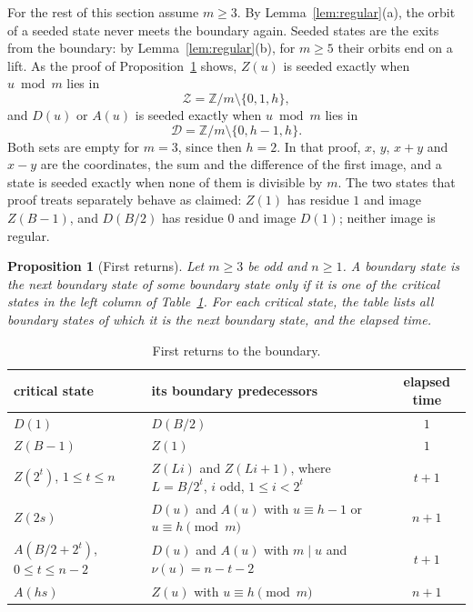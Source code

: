 \documentclass[11pt]{amsart}
\newtheorem{proposition}[theorem]{Proposition}
\theoremstyle{definition}
\theoremstyle{remark}
\newcommand{\Zs}{\mathcal{Z}}
\newcommand{\Ds}{\mathcal{D}}
\newcommand{\vt}{\nu}
\begin{document}
For the rest of this section assume $m\ge3$. By Lemma~\ref{lem:regular}(a), the orbit of a seeded state never meets the boundary again. Seeded states are the exits from the boundary: by Lemma~\ref{lem:regular}(b), for $m\ge5$ their orbits end on a lift. As the proof of Proposition~\ref{prop:table} shows, $Z(u)$ is seeded exactly when $u\bmod m$ lies in
\[
\Zs=\mathbb Z/m\setminus\{0,1,h\},
\]
and $D(u)$ or $A(u)$ is seeded exactly when $u\bmod m$ lies in
\[
\Ds=\mathbb Z/m\setminus\{0,h-1,h\}.
\]
Both sets are empty for $m=3$, since then $h=2$. In that proof, $x$, $y$, $x+y$ and $x-y$ are the coordinates, the sum and the difference of the first image, and a state is seeded exactly when none of them is divisible by $m$. The two states that proof treats separately behave as claimed: $Z(1)$ has residue $1$ and image $Z(B-1)$, and $D(B/2)$ has residue $0$ and image $D(1)$; neither image is regular.

\begin{proposition}[First returns]\label{prop:table}
Let $m\ge3$ be odd and $n\ge1$. A boundary state is the next boundary state of some boundary state only if it is one of the \emph{critical states} in the left column of Table~\ref{tab:returns}. For each critical state, the table lists all boundary states of which it is the next boundary state, and the elapsed time.
\end{proposition}

\begin{table}[h]
\centering
\renewcommand{\arraystretch}{1.15}
\begin{tabular}{@{}lp{6.9cm}c@{}}
\toprule
critical state & its boundary predecessors & elapsed time\\
\midrule
$D(1)$ & $D(B/2)$ & $1$\\
$Z(B-1)$ & $Z(1)$ & $1$\\
$Z(2^t)$, $1\le t\le n$ & $Z(Li)$ and $Z(Li+1)$, where $L=B/2^t$, $i$ odd, $1\le i<2^t$ & $t+1$\\
$Z(2s)$ & $D(u)$ and $A(u)$ with $u\equiv h-1$ or $u\equiv h\pmod m$ & $n+1$\\
$A(B/2+2^t)$, $0\le t\le n-2$ & $D(u)$ and $A(u)$ with $m\mid u$ and $\vt(u)=n-t-2$ & $t+1$\\
$A(hs)$ & $Z(u)$ with $u\equiv h\pmod m$ & $n+1$\\
\bottomrule
\end{tabular}
\caption{First returns to the boundary.}\label{tab:returns}
\end{table}
\end{document}
